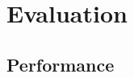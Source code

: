\documentclass[9pt]{sigplanconf}
\begin{document}






\section{Evaluation}

\subsection{Performance}
\end{document}
